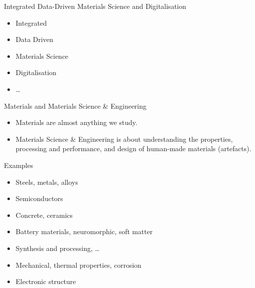 \documentclass[aspectratio=169]{beamer}
\begin{document}
\begin{frame}{Integrated Data-Driven Materials Science and Digitalisation}
  \begin{itemize}
    \item Integrated
    \item Data Driven
    \item Materials Science
    \item Digitalisation
    \item \dots
  \end{itemize}
\end{frame}


\begin{frame}{Materials and Materials Science \& Engineering}
  \begin{itemize}
    \item Materials are almost anything we study.
    \item Materials Science \& Engineering is about understanding the properties, processing and performance, and design of human-made materials (artefacts).
  \end{itemize}
\end{frame}

\begin{frame}{Examples}
  \begin{itemize}
    \item Steels, metals, alloys
    \item Semiconductors
    \item Concrete, ceramics
    \item Battery materials, neuromorphic, soft matter
    \item Synthesis and processing, \dots
    \item Mechanical, thermal properties, corrosion
    \item Electronic structure
  \end{itemize}
\end{frame}
\end{document}
